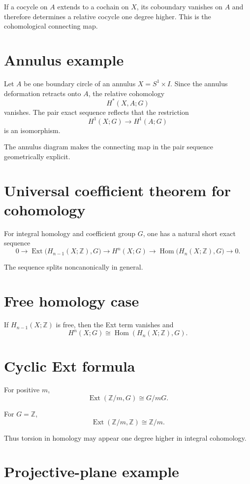 If a cocycle on \(A\) extends to a cochain on \(X\), its coboundary vanishes on
\(A\) and therefore determines a relative cocycle one degree higher.  This is
the cohomological connecting map.

\section{Annulus example}

Let \(A\) be one boundary circle of an annulus \(X=S^1\times I\).
Since the annulus deformation retracts onto \(A\), the relative cohomology
\[
H^*(X,A;G)
\]
vanishes.  The pair exact sequence reflects that the restriction
\[
H^1(X;G)\to H^1(A;G)
\]
is an isomorphism.

The annulus diagram makes the connecting map in the pair sequence geometrically explicit.

\section{Universal coefficient theorem for cohomology}

For integral homology and coefficient group \(G\), one has a natural short exact
sequence
\[
0\to
\operatorname{Ext}\bigl(H_{n-1}(X;\mathbb Z),G\bigr)
\to
H^n(X;G)
\to
\operatorname{Hom}\bigl(H_n(X;\mathbb Z),G\bigr)
\to0.
\]

The sequence splits noncanonically in general.

\section{Free homology case}

If \(H_{n-1}(X;\mathbb Z)\) is free, then the Ext term vanishes and
\[
H^n(X;G)
\cong
\operatorname{Hom}(H_n(X;\mathbb Z),G).
\]

\section{Cyclic Ext formula}

For positive \(m\),
\[
\operatorname{Ext}(\mathbb Z/m,G)\cong G/mG.
\]

For \(G=\mathbb Z\),
\[
\operatorname{Ext}(\mathbb Z/m,\mathbb Z)\cong\mathbb Z/m.
\]

Thus torsion in homology may appear one degree higher in integral cohomology.

\section{Projective-plane example}

